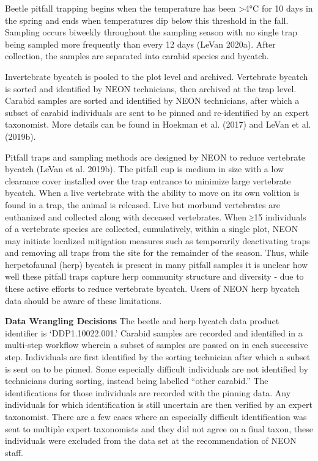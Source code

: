 \documentclass[
  12pt,
]{article}
\begin{document}
Beetle pitfall trapping begins when the temperature has been \textgreater4°C for 10 days in the spring and ends when temperatures dip below this threshold in the fall. Sampling occurs biweekly throughout the sampling season with no single trap being sampled more frequently than every 12 days (LeVan 2020a). After collection, the samples are separated into carabid species and bycatch.

Invertebrate bycatch is pooled to the plot level and archived. Vertebrate bycatch is sorted and identified by NEON technicians, then archived at the trap level. Carabid samples are sorted and identified by NEON technicians, after which a subset of carabid individuals are sent to be pinned and re-identified by an expert taxonomist. More details can be found in Hoekman et al. (2017) and LeVan et al. (2019b).

Pitfall traps and sampling methods are designed by NEON to reduce vertebrate bycatch (LeVan et al. 2019b). The pitfall cup is medium in size with a low clearance cover installed over the trap entrance to minimize large vertebrate bycatch. When a live vertebrate with the ability to move on its own volition is found in a trap, the animal is released. Live but morbund vertebrates are euthanized and collected along with deceased vertebrates. When ≥15 individuals of a vertebrate species are collected, cumulatively, within a single plot, NEON may initiate localized mitigation measures such as temporarily deactivating traps and removing all traps from the site for the remainder of the season. Thus, while herpetofaunal (herp) bycatch is present in many pitfall samples it is unclear how well these pitfall traps capture herp community structure and diversity - due to these active efforts to reduce vertebrate bycatch. Users of NEON herp bycatch data should be aware of these limitations.

\textbf{Data Wrangling Decisions} The beetle and herp bycatch data product identifier is `DDP1.10022.001.' Carabid samples are recorded and identified in a multi-step workflow wherein a subset of samples are passed on in each successive step. Individuals are first identified by the sorting technician after which a subset is sent on to be pinned. Some especially difficult individuals are not identified by technicians during sorting, instead being labelled ``other carabid.'' The identifications for those individuals are recorded with the pinning data. Any individuals for which identification is still uncertain are then verified by an expert taxonomist. There are a few cases where an especially difficult identification was sent to multiple expert taxonomists and they did not agree on a final taxon, these individuals were excluded from the data set at the recommendation of NEON staff.
\end{document}
